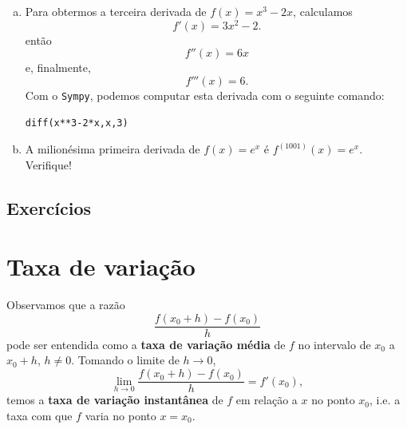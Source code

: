 \begin{ex}
  \begin{enumerate}[a)]
  \item Para obtermos a terceira derivada de $f(x) = x^3 -2x$, calculamos
    \begin{equation}
      f'(x) = 3x^2-2.
    \end{equation}
    então
    \begin{equation}
      f''(x) = 6x
    \end{equation}
    e, finalmente,
    \begin{equation}
      f'''(x) = 6.
    \end{equation}
    \ifispython
    Com o \verb+Sympy+, podemos computar esta derivada com o seguinte comando:
\begin{verbatim}
diff(x**3-2*x,x,3)
\end{verbatim}
    \fi
  \item A milionésima primeira derivada de $f(x) = e^x$ é $f^{(1001)}(x) = e^x$. Verifique!
  \end{enumerate}
\end{ex}

\emconstrucao

\subsection*{Exercícios}

\emconstrucao

\section{Taxa de variação}\label{cap_deriv_sec_apl}

Observamos que a razão
\begin{equation}
  \frac{f(x_0+h)-f(x_0)}{h}
\end{equation}
pode ser entendida como a {\bf taxa de variação média} de $f$ no intervalo de $x_0$ a $x_0+h$, $h\neq 0$. Tomando o limite de $h\to 0$,
\begin{equation}
  \lim_{h\to 0} \frac{f(x_0+h)-f(x_0)}{h} = f'(x_0),
\end{equation}
temos a {\bf taxa de variação instantânea} de $f$ em relação a $x$ no ponto $x_0$, i.e. a taxa com que $f$ varia no ponto $x=x_0$.

